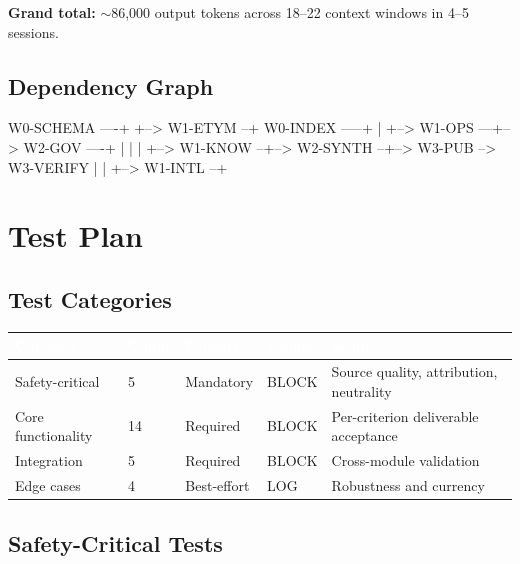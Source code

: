 \documentclass[11pt,letterpaper]{article}
\newcommand{\tableheader}[1]{\textbf{\sffamily\textcolor{white}{#1}}}
\begin{document}
\textbf{Grand total:} $\sim$86,000 output tokens across 18--22 context windows in 4--5 sessions.

\subsection{Dependency Graph}

\begin{asciibox}
  W0-SCHEMA ----+
                +--> W1-ETYM --+
  W0-INDEX -----+              |
                +--> W1-OPS ---+--> W2-GOV ----+
                |              |               |
                +--> W1-KNOW --+--> W2-SYNTH --+--> W3-PUB --> W3-VERIFY
                |              |
                +--> W1-INTL --+
\end{asciibox}

\section{Test Plan}

\subsection{Test Categories}

\begin{center}
\begin{tabularx}{\textwidth}{L{2.5cm}C{1.2cm}C{1.5cm}C{1.5cm}X}
\toprule
{}
\tableheader{Category} & \tableheader{Count} & \tableheader{Priority} & \tableheader{Failure} & \tableheader{Scope} \\
\midrule
Safety-critical & 5 & Mandatory & BLOCK & Source quality, attribution, neutrality \\
Core functionality & 14 & Required & BLOCK & Per-criterion deliverable acceptance \\
Integration & 5 & Required & BLOCK & Cross-module validation \\
Edge cases & 4 & Best-effort & LOG & Robustness and currency \\
\bottomrule
\end{tabularx}
\end{center}

\subsection{Safety-Critical Tests}
\end{document}
